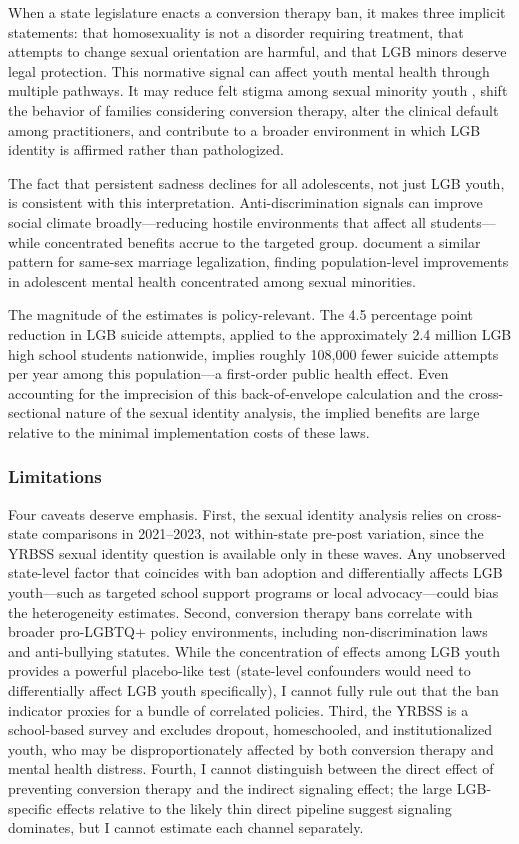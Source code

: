 \documentclass[12pt]{article}
\begin{document}
When a state legislature enacts a conversion therapy ban, it makes three implicit statements: that homosexuality is not a disorder requiring treatment, that attempts to change sexual orientation are harmful, and that LGB minors deserve legal protection. This normative signal can affect youth mental health through multiple pathways. It may reduce felt stigma among sexual minority youth \citep{hatzenbuehler2014}, shift the behavior of families considering conversion therapy, alter the clinical default among practitioners, and contribute to a broader environment in which LGB identity is affirmed rather than pathologized.

The fact that persistent sadness declines for all adolescents, not just LGB youth, is consistent with this interpretation. Anti-discrimination signals can improve social climate broadly---reducing hostile environments that affect all students---while concentrated benefits accrue to the targeted group. \citet{raifman2017} document a similar pattern for same-sex marriage legalization, finding population-level improvements in adolescent mental health concentrated among sexual minorities.

The magnitude of the estimates is policy-relevant. The 4.5 percentage point reduction in LGB suicide attempts, applied to the approximately 2.4 million LGB high school students nationwide, implies roughly 108,000 fewer suicide attempts per year among this population---a first-order public health effect. Even accounting for the imprecision of this back-of-envelope calculation and the cross-sectional nature of the sexual identity analysis, the implied benefits are large relative to the minimal implementation costs of these laws.

\subsubsection*{Limitations} Four caveats deserve emphasis. First, the sexual identity analysis relies on cross-state comparisons in 2021--2023, not within-state pre-post variation, since the YRBSS sexual identity question is available only in these waves. Any unobserved state-level factor that coincides with ban adoption and differentially affects LGB youth---such as targeted school support programs or local advocacy---could bias the heterogeneity estimates. Second, conversion therapy bans correlate with broader pro-LGBTQ+ policy environments, including non-discrimination laws and anti-bullying statutes. While the concentration of effects among LGB youth provides a powerful placebo-like test (state-level confounders would need to differentially affect LGB youth specifically), I cannot fully rule out that the ban indicator proxies for a bundle of correlated policies. Third, the YRBSS is a school-based survey and excludes dropout, homeschooled, and institutionalized youth, who may be disproportionately affected by both conversion therapy and mental health distress. Fourth, I cannot distinguish between the direct effect of preventing conversion therapy and the indirect signaling effect; the large LGB-specific effects relative to the likely thin direct pipeline suggest signaling dominates, but I cannot estimate each channel separately.
\end{document}
